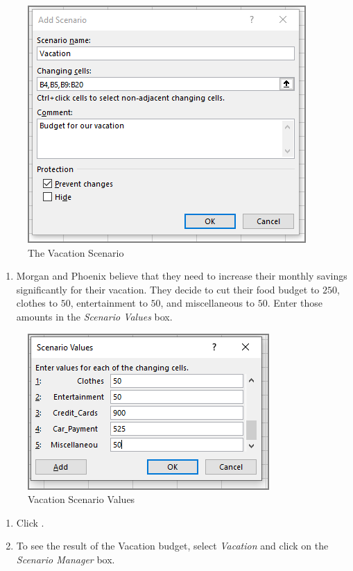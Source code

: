 \begin{figure}[H]
	\centering
	\includegraphics[width=\maxwidth{.75\linewidth}]{gfx/ch08_fig54}
	\caption{The Vacation Scenario}
	\label{08:fig54}
\end{figure}

\begin{enumerate}[resume]	
	
	\item Morgan and Phoenix believe that they need to increase their monthly savings significantly for their vacation. They decide to cut their food budget to $ 250 $, clothes to $ 50 $, entertainment to $ 50 $, and miscellaneous to $ 50 $. Enter those amounts in the \textit{Scenario Values} box.
	
\end{enumerate}

\begin{figure}[H]
	\centering
	\includegraphics[width=\maxwidth{.65\linewidth}]{gfx/ch08_fig55}
	\caption{Vacation Scenario Values}
	\label{08:fig55}
\end{figure}

\begin{enumerate}[resume]	
	
	\item Click .
	\item To see the result of the Vacation budget, select \textit{Vacation} and click  on the \textit{Scenario Manager} box.
	
\end{enumerate}

